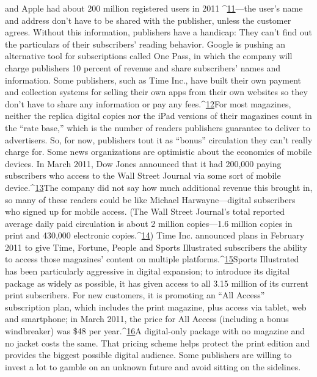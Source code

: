 and Apple had about 200 million registered users in 2011 ^{\href{#endnotes-chapter-4}{11}}—the user's name and
address don't have to be shared with the publisher, unless the customer agrees.
Without this information, publishers have a handicap: They can't find out the
particulars of their subscribers' reading behavior. Google is pushing an alternative
tool for subscriptions called One Pass, in which the company will charge
publishers 10 percent of revenue and share subscribers' names and information.
Some publishers, such as Time Inc., have built their own payment and collection
systems for selling their own apps from their own websites so they don't have to
share any information or pay any fees.^{\href{#endnotes-chapter-4}{12}}For most magazines, neither the replica digital copies nor the iPad versions of
their magazines count in the ``rate base,'' which is the number of readers publishers
guarantee to deliver to advertisers. So, for now, publishers tout it as ``bonus''
circulation they can't really charge for.
Some news organizations are optimistic about the economics of mobile devices.
In March 2011, Dow Jones announced that it had 200,000 paying subscribers
who access to the Wall Street Journal via some sort of mobile device.^{\href{#endnotes-chapter-4}{13}}The
company did not say how much additional revenue this brought in, so many of
these readers could be like Michael Harwayne—digital subscribers who signed
up for mobile access. (The Wall Street Journal's total reported average daily paid
circulation is about 2 million copies—1.6 million copies in print and 430,000
electronic copies.^{\href{#endnotes-chapter-4}{14}})
Time Inc. announced plans in February 2011 to give Time, Fortune, People
and Sports Illustrated subscribers the ability to access those magazines' content
on multiple platforms.^{\href{#endnotes-chapter-4}{15}}Sports Illustrated has been particularly aggressive in digital
expansion; to introduce its digital package as widely as possible, it has given
access to all 3.15 million of its current print subscribers. For new customers, it is
promoting an ``All Access'' subscription plan, which includes the print magazine,
plus access via tablet, web and smartphone; in March 2011, the price for All Access
(including a bonus windbreaker) was \$48 per year.^{\href{#endnotes-chapter-4}{16}}A digital-only package
with no magazine and no jacket costs the same. That pricing scheme helps protect
the print edition and provides the biggest possible digital audience.
Some publishers are willing to invest a lot to gamble on an unknown future
and avoid sitting on the sidelines.
